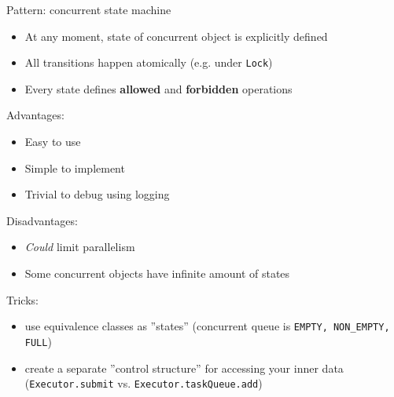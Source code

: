 \begin{frame}{Pattern: concurrent state machine}

\begin{itemize}
    \item At any moment, state of concurrent object is explicitly defined
    \item All transitions happen atomically (e.g. under \texttt{Lock})
    \item Every state defines \textbf{allowed} and \textbf{forbidden} operations  
\end{itemize}

\pause

Advantages:
\begin{itemize}
    \item Easy to use
    \item Simple to implement
    \item Trivial to debug using logging
\end{itemize}

\pause
Disadvantages:
\begin{itemize}
    \item \textit{Could} limit parallelism
    \item Some concurrent objects have infinite amount of states
\end{itemize}

\pause
Tricks: 
\begin{itemize}
    \item use equivalence classes as ''states'' (concurrent queue is \texttt{EMPTY, NON\_EMPTY, FULL})
    \item create a separate ''control structure'' for accessing your inner data (\texttt{Executor.submit} vs. \texttt{Executor.taskQueue.add})
\end{itemize}
\end{frame}


